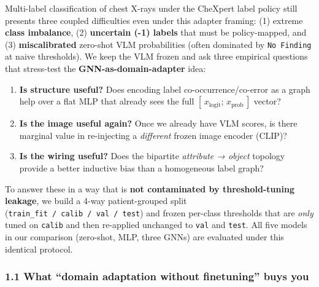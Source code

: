 \documentclass[
  11pt,
]{article}
\providecommand{\tightlist}{%
  \setlength{\itemsep}{0pt}\setlength{\parskip}{0pt}}
\begin{document}
Multi-label classification of chest X-rays under the CheXpert label
policy still presents three coupled difficulties even under this adapter
framing: (1) extreme \textbf{class imbalance}, (2) \textbf{uncertain
(-1) labels} that must be policy-mapped, and (3) \textbf{miscalibrated}
zero-shot VLM probabilities (often dominated by \texttt{No\ Finding} at
naive thresholds). We keep the VLM frozen and ask three empirical
questions that stress-test the \textbf{GNN-as-domain-adapter} idea:

\begin{enumerate}
\def\labelenumi{\arabic{enumi}.}
\tightlist
\item
  \textbf{Is structure useful?} Does encoding label
  co-occurrence/co-error as a graph help over a flat MLP that already
  sees the full \([\,x_{\text{logit}};\,x_{\text{prob}}\,]\) vector?
\item
  \textbf{Is the image useful again?} Once we already have VLM scores,
  is there marginal value in re-injecting a \emph{different} frozen
  image encoder (CLIP)?
\item
  \textbf{Is the wiring useful?} Does the bipartite \emph{attribute →
  object} topology provide a better inductive bias than a homogeneous
  label graph?
\end{enumerate}

To answer these in a way that is \textbf{not contaminated by
threshold-tuning leakage}, we build a 4-way patient-grouped split
(\texttt{train\_fit\ /\ calib\ /\ val\ /\ test}) and frozen per-class
thresholds that are \emph{only} tuned on \texttt{calib} and then
re-applied unchanged to \texttt{val} and \texttt{test}. All five models
in our comparison (zero-shot, MLP, three GNNs) are evaluated under this
identical protocol.

\subsubsection{1.1 What ``domain adaptation without finetuning'' buys
you}\label{what-domain-adaptation-without-finetuning-buys-you}
\end{document}
